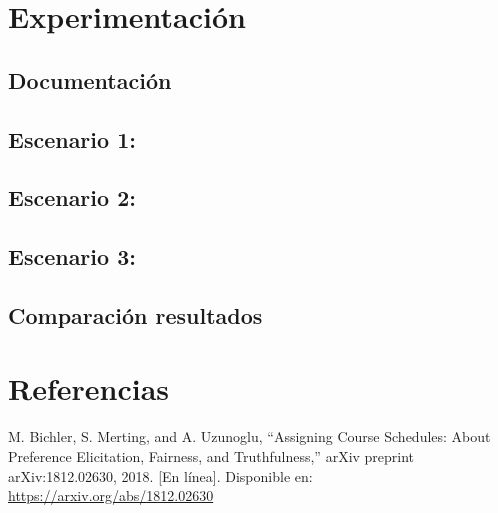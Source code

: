 \documentclass{article}
\begin{document}
\section{Experimentación}\label{sec:exp}

\subsection{Documentación}


\subsection{Escenario 1:}


\subsection{Escenario 2:}

\subsection{Escenario 3:}

\subsection{Comparación resultados}


\section{Referencias}
\renewcommand{\refname}{}
\begin{thebibliography}{9}

 \label{ref:BPS} M. Bichler, S. Merting, and A. Uzunoglu, 
“Assigning Course Schedules: About Preference Elicitation, Fairness, and Truthfulness,” 
arXiv preprint arXiv:1812.02630, 2018. [En línea]. Disponible en: 
\url{https://arxiv.org/abs/1812.02630}



\end{thebibliography}
\end{document}

